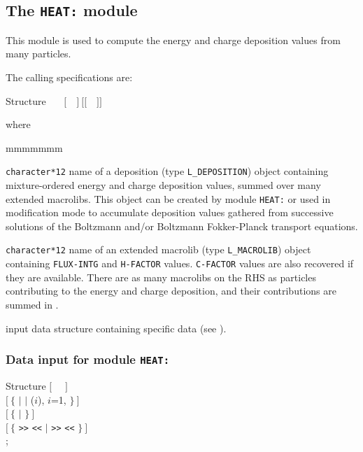 \subsection{The {\tt HEAT:} module}\label{sect:HEATData}

This module is used to compute the energy and charge deposition values from many particles.

\vskip 0.02cm

The calling specifications are:

\begin{DataStructure}{Structure }
~\moc{:=}~~$[$~~$]~[[$~~$]]$ \moc{::}  \\
\end{DataStructure}

\noindent where
\begin{ListeDeDescription}{mmmmmmm}

\item[\dusa{DEPOS}] {\tt character*12} name of a {\sc deposition} (type {\tt L\_DEPOSITION}) object containing mixture-ordered energy and charge deposition values, summed over many extended macrolibs. This object can be created by module {\tt HEAT:} or used in modification mode to
accumulate deposition values gathered from successive solutions of the Boltzmann and/or Boltzmann Fokker-Planck transport equations.

\item[\dusa{MACRO}] {\tt character*12} name of an extended {\sc macrolib} (type {\tt L\_MACROLIB}) object containing {\tt FLUX-INTG} and {\tt H-FACTOR} values.
{\tt C-FACTOR} values are also recovered if they are available. There are as many macrolibs on the RHS as particles contributing to the energy and charge deposition, and their contributions are summed in .

\item[\dusa{HEAT\_data}] input data structure containing specific data (see ).

\end{ListeDeDescription}

\subsubsection{Data input for module {\tt HEAT:}}\label{sect:descHEAT}

\vskip -0.5cm

\begin{DataStructure}{Structure }
$[$~ ~$]$ \\
$[~\{$   $|$   $|$  ($i$), $i$=1, $\}~]$ \\
$[~\{$  $|$  $\}~]$ \\
$[~\{$   {\tt >>}  {\tt <<} $|$   {\tt >>}  {\tt <<} $\}~]$ \\
;
\end{DataStructure}

